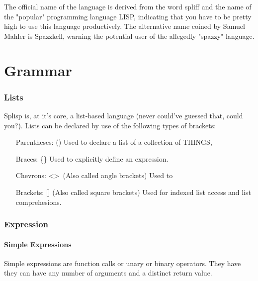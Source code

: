 \documentclass{scrartcl}
\begin{document}

The official name of the language is derived from the word spliff and the name of the "popular" programming language LISP, indicating that you have to be pretty high to use this language productively. The alternative name coined by Samuel Mahler is Spazzkell, warning the potential user of the allegedly "spazzy" language.




\part{Grammar}

\section{Lists}

Splisp is, at it's core, a list-based language (never could've guessed that, could you?). Lists can be declared by use of the following types of brackets:

\begin{itemize}
    \item[Parentheses:] () \newline
        Used to declare a list of a collection of THINGS, 
    \item[Braces:] \{\} \newline
        Used to explicitly define an expression.
    \item[Chevrons:] \textless\textgreater\ (Also called angle brackets) \newline
        Used to 
    \item[Brackets:] [] (Also called square brackets) \newline
        Used for indexed list access and list comprehesions.
\end{itemize}

\section{Expression}

\subsection{Simple Expressions}

Simple expressions are function calls or unary or binary operators. They have they can have any number of arguments and a distinct return value.
\end{document}
